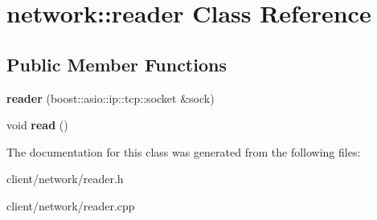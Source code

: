 \hypertarget{classnetwork_1_1reader}{\section{network\-:\-:reader Class Reference}
\label{classnetwork_1_1reader}
}
\subsection*{Public Member Functions}
\begin{DoxyCompactItemize}
\item 
\hypertarget{classnetwork_1_1reader_a0e0aaa43ceb87702bc372aec53089a93}{{\bfseries reader} (boost\-::asio\-::ip\-::tcp\-::socket \&sock)}\label{classnetwork_1_1reader_a0e0aaa43ceb87702bc372aec53089a93}

\item 
\hypertarget{classnetwork_1_1reader_a17fe7cd756024b71411762c17bd5ea6f}{void {\bfseries read} ()}\label{classnetwork_1_1reader_a17fe7cd756024b71411762c17bd5ea6f}

\end{DoxyCompactItemize}


The documentation for this class was generated from the following files\-:\begin{DoxyCompactItemize}
\item 
client/network/reader.\-h\item 
client/network/reader.\-cpp\end{DoxyCompactItemize}
